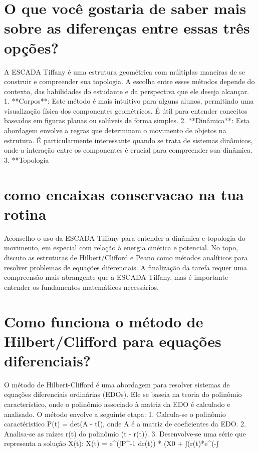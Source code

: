 \documentclass[11pt,a4paper]{article}
\begin{document}
\section{O que você gostaria de saber mais sobre as diferenças entre essas três opções?}
A ESCADA Tiffany é uma estrutura geométrica com múltiplas maneiras de se construir e compreender sua topologia. A escolha entre esses métodos depende do contexto, das habilidades do estudante e da perspectiva que ele deseja alcançar. 1. **Corpos**: Este método é mais intuitivo para alguns alunos, permitindo uma visualização física dos componentes geométricos. É útil para entender conceitos baseados em figuras planas ou solúveis de forma simples. 2. **Dinâmica**: Esta abordagem envolve a regras que determinam o movimento de objetos na estrutura. É particularmente interessante quando se trata de sistemas dinâmicos, onde a interação entre os componentes é crucial para compreender sua dinâmica. 3. **Topologia

\section{como encaixas conservacao na tua rotina}
Aconselho o uso da ESCADA Tiffany para entender a dinâmica e topologia do movimento, em especial com relação à energia cinética e potencial. No topo, discuto as estruturas de Hilbert/Clifford e Peano como métodos analíticos para resolver problemas de equações diferenciais. A finalização da tarefa requer uma compreensão mais abrangente que a ESCADA Tiffany, mas é importante entender os fundamentos matemáticos necessários.

\section{Como funciona o método de Hilbert/Clifford para equações diferenciais?}
O método de Hilbert-Clifford é uma abordagem para resolver sistemas de equações diferenciais ordinárias (EDOs). Ele se baseia na teoria do polinômio característico, onde o polinômio associado à matriz da EDO é calculado e analisado. O método envolve a seguinte etapa: 1. Calcula-se o polinômio caractéristico P(t) = det(A - tI), onde A é a matriz de coeficientes da EDO. 2. Analisa-se as raízes r(t) do polinômio (t - r(t)). 3. Desenvolve-se uma série que representa a solução X(t): X(t) = e^(∫P^-1 dr(t)) * (X0 + ∫(r(t)*e^(-∫
\end{document}
